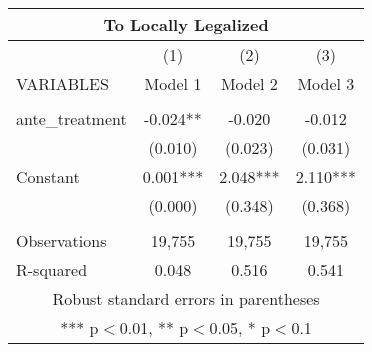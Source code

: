 \begin{tabular}{lccc}
\multicolumn{4}{c}{To Locally Legalized} \\ \hline
 & (1) & (2) & (3) \\
VARIABLES & Model 1 & Model 2 & Model 3 \\ \hline
 &  &  &  \\
ante\_treatment & -0.024** & -0.020 & -0.012 \\
 & (0.010) & (0.023) & (0.031) \\
Constant & 0.001*** & 2.048*** & 2.110*** \\
 & (0.000) & (0.348) & (0.368) \\
 &  &  &  \\
Observations & 19,755 & 19,755 & 19,755 \\
 R-squared & 0.048 & 0.516 & 0.541 \\ \hline
\multicolumn{4}{c}{ Robust standard errors in parentheses} \\
\multicolumn{4}{c}{ *** p$<$0.01, ** p$<$0.05, * p$<$0.1} \\
\end{tabular}
